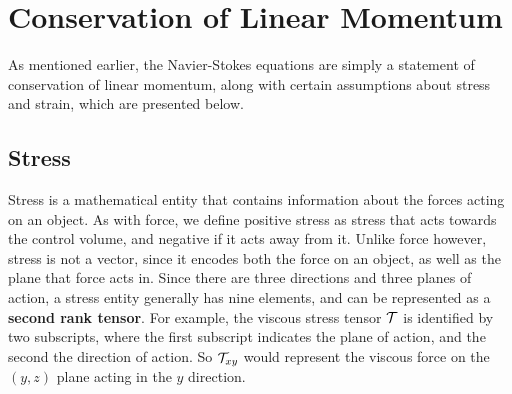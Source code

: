 \section{Conservation of Linear Momentum} 

As mentioned earlier, the Navier-Stokes equations are simply a statement of conservation of linear momentum, along with certain assumptions about stress  and strain, which are presented below. 
\subsection{Stress}

Stress is a mathematical entity that contains information about the forces acting on an object. As with force, we define positive stress as stress that acts towards the control volume, and negative if it acts away from it. Unlike force however, stress is not a vector, since it encodes both the force on an object, as well as the plane that force acts in. Since there are three directions and three planes of action, a stress entity generally has nine elements, and can be represented as a {\bf second rank tensor}. For example, the viscous stress tensor $\mathcal{T}$ is identified by two subscripts, where the first subscript indicates the plane of action, and the second the direction of action. So $\mathcal{T}_{xy}$ would represent the viscous force on the $(y,z)$ plane acting in the $y$ direction. 


